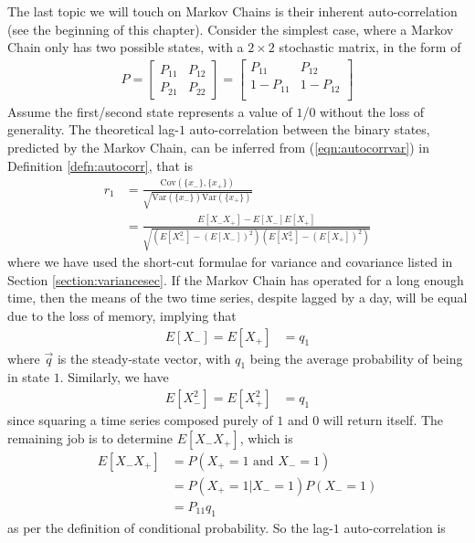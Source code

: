 The last topic we will touch on Markov Chains is their inherent auto-correlation (see the beginning of this chapter). Consider the simplest case, where a Markov Chain only has two possible states, with a $2 \times 2$ stochastic matrix, in the form of
\begin{align}
P = 
\begin{bmatrix}
P_{11} & P_{12} \\
P_{21} & P_{22}
\end{bmatrix}
=
\begin{bmatrix}
P_{11} & P_{12} \\
1 - P_{11} & 1 - P_{12} \\
\end{bmatrix}
\end{align}
Assume the first/second state represents a value of $1$/$0$ without the loss of generality. The theoretical lag-$1$ auto-correlation between the binary states, predicted by the Markov Chain, can be inferred from (\ref{eqn:autocorrvar}) in Definition \ref{defn:autocorr}, that is
\begin{align*}
r_1 &= \frac{\text{Cov}(\{x_{-}\},\{x_{+}\})}{\sqrt{\text{Var}(\{x_{-}\}) \text{Var}(\{x_{+}\})}} \\
&= \frac{E[X_{-}X_{+}] - E[X_{-}]E[X_{+}]}{\sqrt{(E[X_{-}^2] - (E[X_{-}])^2)(E[X_{+}^2] - (E[X_{+}])^2)}}
\end{align*}
where we have used the short-cut formulae for variance and covariance listed in Section \ref{section:variancesec}. If the Markov Chain has operated for a long enough time, then the means of the two time series, despite lagged by a day, will be equal due to the loss of memory, implying that
\begin{align}
E[X_{-}] = E[X_{+}] &= q_1
\end{align}
where $\vec{q}$ is the steady-state vector, with $q_1$ being the average probability of being in state $1$. Similarly, we have
\begin{align}
E[X_{-}^2] = E[X_{+}^2] &= q_1 
\end{align}
since squaring a time series composed purely of $1$ and $0$ will return itself. The remaining job is to determine $E[X_{-}X_{+}]$, which is
\begin{align}
E[X_{-}X_{+}] &= P(X_{+}=1 \text{ and } X_{-}=1) \nonumber \\
&= P(X_{+}=1|X_{-}=1) P(X_{-}=1) \nonumber \\
&= P_{11} q_1
\end{align}
as per the definition of conditional probability. So the lag-$1$ auto-correlation is
